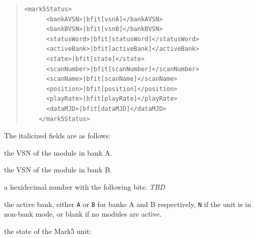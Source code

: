 \begin{description}
\begin{quotation}
\begin{Verbatim}[commandchars=\|\[\]]
    <mark5Status>
      <bankAVSN>|bfit[vsnA]</bankAVSN>
      <bankBVSN>|bfit[vsnB]</bankBVSN>
      <statusWord>|bfit[statusWord]</statusWord>
      <activeBank>|bfit[activeBank]</activeBank>
      <state>|bfit[state]</state>
      <scanNumber>|bfit[scanNumber]</scanNumber>
      <scanName>|bfit[scanName]</scanName>
      <position>|bfit[position]</position>
      <playRate>|bfit[playRate]</playRate>
      <dataMJD>|bfit[dataMJD]</dataMJD>
    </mark5Status>
\end{Verbatim}
\end{quotation}

\noindent The italicized fields are as follows:

\begin{description}
\item{} the VSN of the module in bank A.
\item{} the VSN of the module in bank B.
\item{} a hexidecimal number with the following bits:
{\em TBD}
\item{} the active bank, either {\tt A} or {\tt B} for banks A and B respectively, {\tt N} if the unit is in non-bank mode, or blank if no modules are active.
\item{} the state of the Mark5 unit:


\end{description}
\end{description}
